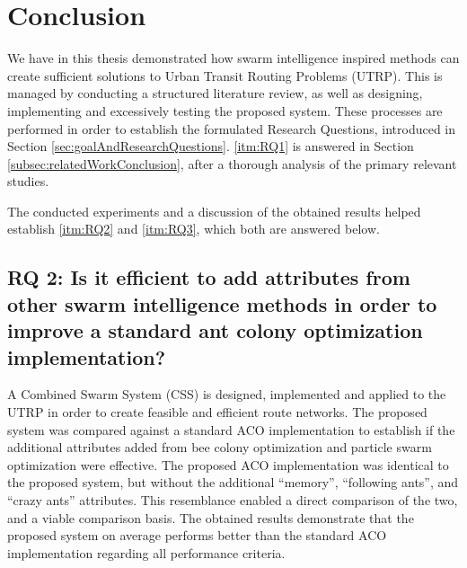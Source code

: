 \section{Conclusion}
\label{sec:conclusion}

We have in this thesis demonstrated how swarm intelligence inspired methods can create sufficient solutions to Urban Transit Routing Problems (UTRP). This is managed by conducting a structured literature review\citep{kofod2014}, as well as designing, implementing and excessively testing the proposed system. These processes are performed in order to establish the formulated Research Questions, introduced in Section \vref{sec:goalAndResearchQuestions}. \ref{itm:RQ1} is answered in Section \vref{subsec:relatedWorkConclusion}, after a thorough analysis of the primary relevant studies. 

The conducted experiments and a discussion of the obtained results helped establish \ref{itm:RQ2} and \ref{itm:RQ3}, which both are answered below. 


\subsection*{RQ 2: Is it efficient to add attributes from other swarm intelligence methods in order to improve a standard ant colony optimization implementation?}

A Combined Swarm System (CSS) is designed, implemented and applied to the UTRP in order to create feasible and efficient route networks. The proposed system was compared against a standard ACO implementation to establish if the additional attributes added from bee colony optimization and particle swarm optimization were effective. The proposed ACO implementation was identical to the proposed system, but without the additional ``memory'', ``following ants'', and ``crazy ants'' attributes. This resemblance enabled a direct comparison of the two, and a viable comparison basis. The obtained results demonstrate that the proposed system on average performs better than the standard ACO implementation regarding all performance criteria.

